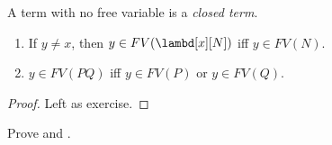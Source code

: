 \documentclass[../../../include/open-logic-section]{subfiles}
\begin{document}
\begin{defn}
  A term with no free variable is a \emph{closed term}.
\end{defn}

\begin{lem}
  \begin{enumerate}
    \item {} If $y \neq x$, then $y \in FV(\lambd[x][N])$ iff $y \in
    FV(N)$.
    \item {} $y \in FV(PQ)$ iff $y \in FV(P)$ or
      $y \in FV(Q)$.
    \end{enumerate}
\end{lem}
\begin{proof}
  Left as exercise.
\end{proof}

\begin{prob}
  Prove  and .
\end{prob}
\end{document}
